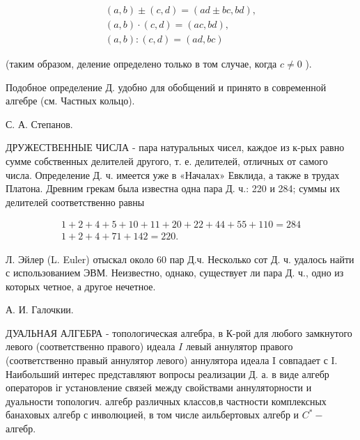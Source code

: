 \documentclass[10pt]{article}
\begin{document}
\[

\begin{gathered}

(a, b) \pm(c, d)=(a d \pm b c, b d), \\

(a, b) \cdot(c, d)=(a c, b d), \\

(a, b):(c, d)=(a d, b c)

\end{gathered}

\]



(таким образом, деление определено только в том случае, когда $c \neq 0$ ).



Подобное определение Д. удобно для обобщений и принято в современной алгебре (см. Частных кольцо).



С. А. Степанов.



ДРУЖЕСТВЕННЫЕ ЧИСЛА - пара натуральных чисел, каждое из к-рых равно сумме собственных делителей другого, т. е. делителей, отличных от самого числа. Определение Д. ч. имеется уже в «Началах» Евклида, а также в трудах Платона. Древним грекам была известна одна пара Д. ч.: 220 и 284; суммы их делителей соответственно равны



\[

\begin{gathered}

1+2+4+5+10+11+20+22+44+55+110=284 \\

1+2+4+71+142=220 .

\end{gathered}

\]



Л. Эйлер (L. Euler) отыскал около 60 пар Д.ч. Несколько сот Д. ч. удалось найти с использованием ЭВМ. Неизвестно, однако, существует ли пара Д. ч., одно из которых четное, а другое нечетное.



А. И. Галочкии.



ДУАЛЬНАЯ АЛГЕБРА - топологическая алгебра, в К-рой для любого замкнутого левого (соответственно правого) идеала $I$ левый аннулятор правого (соответственно правый аннулятор левого) аннулятора идеала I совпадает с I. Наибольший интерес представляют вопросы реализации Д. а. в виде алгебр операторов іг установление связей между свойствами аннуляторности и дуальности топологич. алгебр различных классов,в частности комплексных банаховых алгебр с инволюцией, в том числе аильбертовых алгебр и $C^{*}-$ алгебр.
\end{document}
